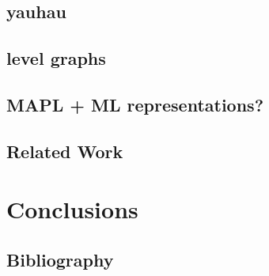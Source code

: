 \documentclass{report}
\begin{document}
\section{yauhau}
\section{level graphs}
\section{MAPL + ML representations?}

\section{Related Work}

\chapter{Conclusions} 

\section{Bibliography} 
\end{document}
